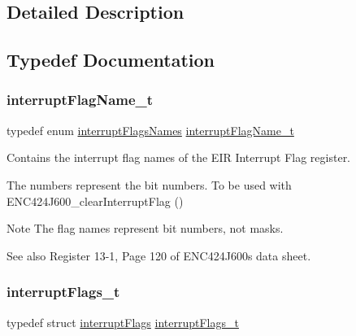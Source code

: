\subsection{Detailed Description}


\subsection{Typedef Documentation}
\mbox{\label{group__interrupts_gaa2c8c63912e19f8bccebc09dfc23023a}} 
\subsubsection{\texorpdfstring{interruptFlagName\_t}{interruptFlagName\_t}}
{\footnotesize\ttfamily typedef enum \mbox{\hyperlink{group__interrupts_gaf692e993b72f242633eee1b443276547}{interrupt\+Flags\+Names}}  \mbox{\hyperlink{group__interrupts_gaa2c8c63912e19f8bccebc09dfc23023a}{interrupt\+Flag\+Name\+\_\+t}}}



Contains the interrupt flag names of the E\+IR Interrupt Flag register. 

The numbers represent the bit numbers. To be used with E\+N\+C424\+J600\+\_\+clear\+Interrupt\+Flag () \begin{DoxyNote}{Note}
The flag names represent bit numbers, not masks. 
\end{DoxyNote}
\begin{DoxySeeAlso}{See also}
Register 13-\/1, Page 120 of E\+N\+C424\+J600\textquotesingle{}s data sheet. 
\end{DoxySeeAlso}
\mbox{\label{group__interrupts_ga337298055be267e726930c9fc6b2d4eb}} 
\subsubsection{\texorpdfstring{interruptFlags\_t}{interruptFlags\_t}}
{\footnotesize\ttfamily typedef struct \mbox{\hyperlink{structinterrupt_flags}{interrupt\+Flags}}  \mbox{\hyperlink{group__interrupts_ga337298055be267e726930c9fc6b2d4eb}{interrupt\+Flags\+\_\+t}}}




